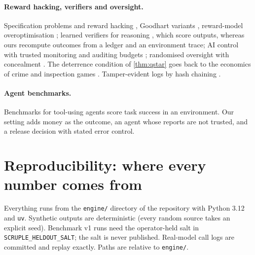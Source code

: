 \documentclass[11pt]{article}
\theoremstyle{definition}
\theoremstyle{remark}
\newcommand{\1}{\mathbf{1}}
\begin{document}
\paragraph{Reward hacking, verifiers and oversight.} Specification problems and reward hacking \citep{amodei2016,skalse2022,pan2022}, Goodhart variants \citep{manheim2018}, reward-model overoptimisation \citep{gao2023}; learned verifiers for reasoning \citep{cobbe2021,lightman2024}, which score outputs, whereas ours recompute outcomes from a ledger and an environment trace; AI control with trusted monitoring and auditing budgets \citep{greenblatt2024}; randomised oversight with concealment \citep{gans2026}. The deterrence condition of \cref{thm:qstar} goes back to the economics of crime and inspection games \citep{becker1968,avenhaus2002}. Tamper-evident logs by hash chaining \citep{schneier1999}.

\paragraph{Agent benchmarks.} Benchmarks for tool-using agents \citep{liu2024agentbench,yao2024tau,jimenez2024swebench} score task success in an environment. Our setting adds money as the outcome, an agent whose reports are not trusted, and a release decision with stated error control.





\appendix
\section{Reproducibility: where every number comes from}\label{app:repro}

Everything runs from the \texttt{engine/} directory of the repository with Python 3.12 and \texttt{uv}. Synthetic outputs are deterministic (every random source takes an explicit seed). Benchmark v1 runs need the operator-held salt in \texttt{SCRUPLE\_HELDOUT\_SALT}; the salt is never published. Real-model call logs are committed and replay exactly. Paths are relative to \texttt{engine/}.
\end{document}

